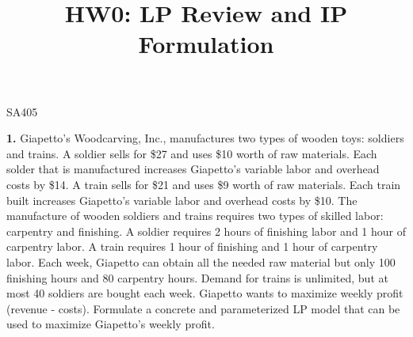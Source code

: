 \documentclass[11pt]{article}
\makeatletter
\theoremstyle{definition}
\renewcommand{\maketitle}{
  \noindent SA405 

  \begin{center}\Large{\textbf{\@title}}\end{center}
}
\makeatother
\begin{document}
\title{HW0: LP Review and IP Formulation}


\maketitle

\textbf{1.} Giapetto’s Woodcarving, Inc., manufactures two types of wooden toys: soldiers and trains. A soldier sells for \$27 and uses \$10 worth of raw materials. Each solder that is manufactured increases Giapetto’s variable labor and overhead costs by \$14. A train sells for \$21 and uses \$9 worth of raw materials. Each train built increases Giapetto’s variable labor and overhead costs by \$10. The manufacture of wooden soldiers and trains requires two types of skilled labor: carpentry and finishing. A soldier requires 2 hours of finishing labor and 1 hour of carpentry labor. A train requires 1 hour of finishing and 1 hour of carpentry labor. Each week, Giapetto can obtain all the needed raw material but only 100 finishing hours and 80 carpentry hours. Demand for trains is unlimited, but at most 40 soldiers are bought each week. Giapetto wants to maximize weekly profit (revenue - costs). Formulate a concrete and parameterized LP model that can be used to maximize Giapetto’s weekly profit.
\end{document}
